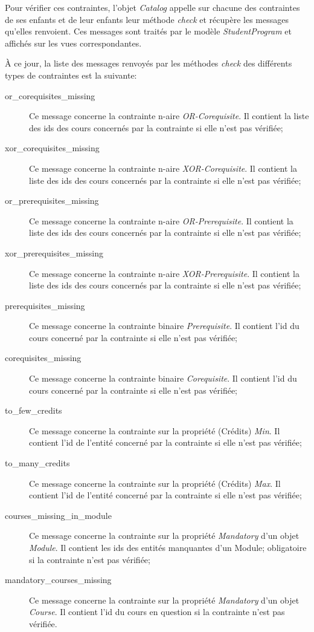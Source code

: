 Pour vérifier ces contraintes, l'objet \textit{Catalog} appelle sur chacune des contraintes de ses enfants et de leur enfants leur méthode \textit{check} et récupère les messages qu'elles renvoient. Ces messages sont traités par le modèle \textit{StudentProgram} et affichés sur les vues correspondantes.

À ce jour, la liste des messages renvoyés par les méthodes \textit{check} des différents types de contraintes est la suivante:

\begin{description}
\item[or\_corequisites\_missing] Ce message concerne la contrainte n-aire \textit{OR-Corequisite}. Il contient la liste des ids des cours concernés par la contrainte si elle n'est pas vérifiée;
\item[xor\_corequisites\_missing] Ce message concerne la contrainte n-aire \textit{XOR-Corequisite}. Il contient la liste des ids des cours concernés par la contrainte si elle n'est pas vérifiée;
\item[or\_prerequisites\_missing] Ce message concerne la contrainte n-aire \textit{OR-Prerequisite}. Il contient la liste des ids des cours concernés par la contrainte si elle n'est pas vérifiée;
\item[xor\_prerequisites\_missing] Ce message concerne la contrainte n-aire \textit{XOR-Prerequisite}. Il contient la liste des ids des cours concernés par la contrainte si elle n'est pas vérifiée;
\item[prerequisites\_missing] Ce message concerne la contrainte binaire \textit{Prerequisite}. Il contient l'id du cours concerné par la contrainte si elle n'est pas vérifiée;
\item[corequisites\_missing] Ce message concerne la contrainte binaire \textit{Corequisite}. Il contient l'id du cours concerné par la contrainte si elle n'est pas vérifiée;
\item[to\_few\_credits] Ce message concerne la contrainte sur la propriété (Crédits) \textit{Min}. Il contient l'id de l'entité concerné par la contrainte si elle n'est pas vérifiée;
\item[to\_many\_credits] Ce message concerne la contrainte sur la propriété (Crédits) \textit{Max}. Il contient l'id de l'entité concerné par la contrainte si elle n'est pas vérifiée;
\item[courses\_missing\_in\_module] Ce message concerne la contrainte sur la propriété \textit{Mandatory} d'un objet \textit{Module}. Il contient les ids des entités manquantes d'un Module; obligatoire si la contrainte n'est pas vérifiée;  
\item[mandatory\_courses\_missing] Ce message concerne la contrainte sur la propriété \textit{Mandatory} d'un objet \textit{Course}. Il contient l'id du cours en question si la contrainte n'est pas vérifiée.
\end{description}

